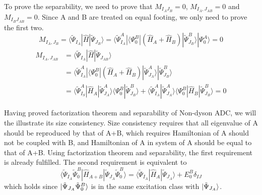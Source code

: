 To prove the separability, we need to prove that $M_{I_A J_B}=0$, $M_{I_A, J_{AB}}=0$ and $M_{I_B J_{AB}}=0$.
Since A and B are treated on equal footing, we only need to prove the first two.
\begin{equation}
	M_{I_{A}, J_{B}}=\langle\tilde{\Psi}_{I_{A}}|\hat{H}| \tilde{\Psi}_{J_{B}}\rangle=\langle\tilde{\Psi}_{I_{A}}^{A}|\langle\Psi_{0}^{B}|\left(\hat{H}_{A}+\hat{H}_{B}\right)| \tilde{\Psi}_{J_{B}}^{B}\rangle| \Psi_{0}^{A}\rangle= 0
\end{equation}
\begin{equation}
	\begin{aligned}
		M_{I_{A}, J_{A B}} &=\langle\tilde{\Psi}_{I_{A}}|\hat{H}| \tilde{\Psi}_{J_{A B}}\rangle 
		\\
		&=\langle\tilde{\Psi}_{I_{A}}^{A}|\langle\Psi_{0}^{B}|\left(\hat{H}_{A}+\hat{H}_{B}\right)| \tilde{\Psi}_{J_{A}}^{A}\rangle| \tilde{\Psi}_{J_{B}}^{B}\rangle 
		\\
		&=\langle\tilde{\Psi}_{I_{S}}^{A} | \hat{H}_A | \tilde{\Psi}_{J_{A}}^{A}\rangle \langle\Psi_{0}^{B} | \tilde{\Psi}_{J_{B}}^{B}\rangle
		+\langle\tilde{\Psi}_{I_{A}}^{A} | \tilde{\Psi}_{J_{A}}^{A}\rangle \langle\Psi_{0}^{B}|\hat{H}_{B}| \tilde{\Psi}_{J_{B}}^{B}\rangle= 0
	\end{aligned}
\end{equation}

Having proved factorization theorem and separability of Non-dyson ADC, we will the illustrate its size consistency.
Size consistency requires that all eigenvalue of A should be reproduced by that of A+B, which requires Hamiltonian of A should not be coupled with B, and Hamiltonian of A in system of A should be equal to that of A+B.
Using factorization theorem and separability, the first requirement is already fulfilled.
The second requirement is equivalent to
%
\begin{equation}
	\langle \tilde{\Psi}_{I_A} \tilde{\Psi}_0^B | \hat{H}_{A+B}| \tilde{\Psi}_{J_A} \tilde{\Psi}_0^B \rangle
	= \langle \tilde{\Psi}_{I_A} | \hat{H}_A | \tilde{\Psi}_{J_A} \rangle
	+ E_0^B \delta_{IJ}
\end{equation}
which holds since $\ket{\tilde{\Psi}_{J_A} \tilde{\Psi}_0^B}$ is in the same excitation class with $\ket{\tilde{\Psi}_{J_A}}$. 

